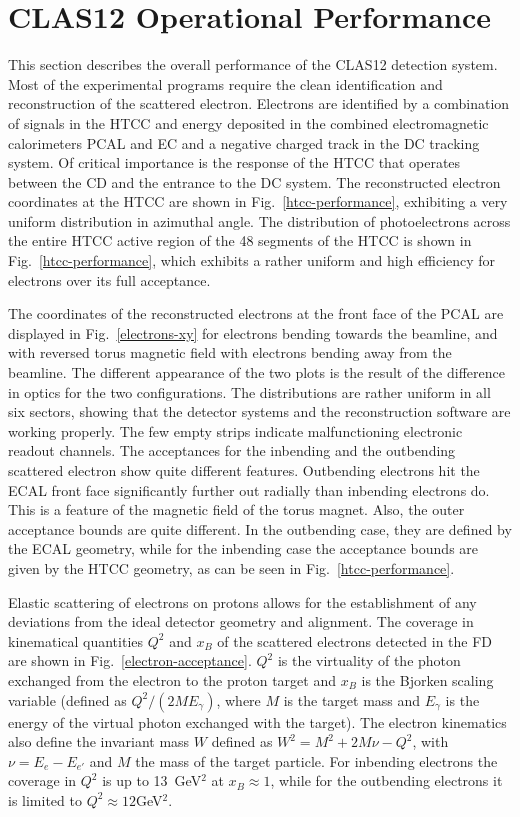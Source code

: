 \documentclass[final,3p,twocolumn]{elsarticle}
\begin{document}
\section{CLAS12 Operational Performance}

This section describes the overall performance of the CLAS12 detection system. Most of the experimental
programs require the clean identification and reconstruction of the scattered electron. Electrons are identified
by a combination of signals in the HTCC and energy deposited in the combined electromagnetic calorimeters PCAL
and EC and a negative charged track in the DC tracking system. Of critical importance is the response of the HTCC
that operates between the CD and the entrance to the DC system. The reconstructed electron coordinates at the
HTCC are shown in Fig.~\ref{htcc-performance}, exhibiting a very uniform distribution in azimuthal angle. The
distribution of photoelectrons across the entire HTCC active region of the 48 segments of the HTCC is shown
in Fig.~\ref{htcc-performance}, which exhibits a rather uniform and high efficiency for electrons over its full acceptance.

The coordinates of the reconstructed electrons at the front face of the PCAL are displayed in
Fig.~\ref{electrons-xy} for electrons bending towards the beamline, and with
reversed torus magnetic field with electrons bending away from the beamline. The different appearance of the two
plots is the result of the difference in optics for the two configurations. The distributions are rather uniform in all
six sectors, showing that the detector systems and the reconstruction software are working properly. The few
empty strips indicate malfunctioning electronic readout channels. The acceptances for the inbending and the
outbending scattered electron show quite different features. Outbending electrons hit the ECAL front face
significantly further out radially than inbending electrons do. This is a feature of the magnetic field of the torus
magnet.  Also, the outer acceptance bounds are quite different. In the outbending case, they are defined by the
ECAL geometry, while for the inbending case the acceptance bounds are given by the HTCC geometry, as can be
seen in Fig.~\ref{htcc-performance}.      

Elastic scattering  of electrons on protons allows for the establishment of any deviations from the ideal detector
geometry and alignment. The coverage in kinematical quantities $Q^2$ and $x_B$ of the scattered electrons
detected in the FD are shown in Fig.~\ref{electron-acceptance}. $Q^2$ is the virtuality of the photon exchanged
from the electron to the proton target and $x_B$ is the Bjorken scaling variable (defined as $Q^2/(2 M E_\gamma)$,
where $M$ is the target mass and $E_\gamma$ is the energy of the virtual photon exchanged with the target). 
The electron kinematics also define the invariant mass $W$ defined as $W^2 = M^2 + 2M\nu - Q^2$, with
$\nu = E_e - E_{e'}$ and $M$ the mass of the target particle. 
For
inbending electrons the coverage in $Q^2$ is up to 13~GeV$^2$ at $x_B \approx 1$, while for the outbending
electrons it is limited to  $Q^2 \approx 12$GeV$^2$. 
\end{document}

